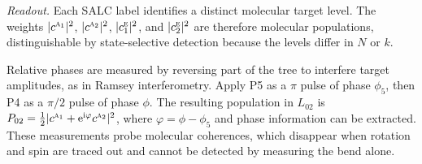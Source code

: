\emph{Readout.} Each SALC label identifies a distinct molecular target level. The weights $|c^{\text{\normalfont\scshape a}_{1}}|^2$, $|c^{\text{\normalfont\scshape a}_{2}}|^2$, $|c^{\text{\normalfont\scshape e}}_{1}|^2$, and $|c^{\text{\normalfont\scshape e}}_{2}|^2$ are therefore molecular populations, distinguishable by state-selective detection because the levels differ in $N$ or $k$.

Relative phases are measured by reversing part of the tree to interfere target amplitudes, as in Ramsey interferometry. Apply P5 as a $\pi$ pulse of phase $\phi_5$, then P4 as a $\pi/2$ pulse of phase $\phi$. The resulting population in $L_{02}$ is $P_{02}=\tfrac12|c^{\text{\normalfont\scshape a}_{1}}+\mathrm{e}^{\mathrm{i}\varphi}c^{\text{\normalfont\scshape a}_{2}}|^2$, where $\varphi=\phi-\phi_5$ and phase information can be extracted.  These measurements probe molecular coherences, which disappear when rotation and spin are traced out and cannot be detected by measuring the bend alone.

